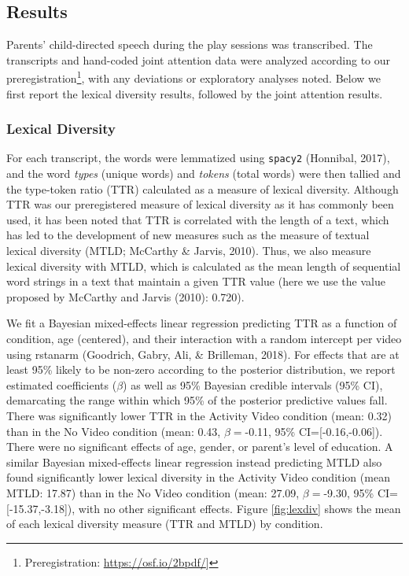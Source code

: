 \documentclass[man,floatsintext]{apa6}
\let\rmarkdownfootnote\footnote%
\def\footnote{\protect\rmarkdownfootnote}
\begin{document}
\hypertarget{results}{%
\subsection{Results}\label{results}}

Parents' child-directed speech during the play sessions was transcribed.
The transcripts and hand-coded joint attention data were analyzed according to our preregistration\footnote{Preregistration: \url{https://osf.io/2bpdf/}{]}}, with any deviations or exploratory analyses noted.
Below we first report the lexical diversity results, followed by the joint attention results.

\hypertarget{lexical-diversity}{%
\subsubsection{Lexical Diversity}\label{lexical-diversity}}

For each transcript, the words were lemmatized using \texttt{spacy2} (Honnibal, 2017), and the word \emph{types} (unique words) and \emph{tokens} (total words) were then tallied and the type-token ratio (TTR) calculated as a measure of lexical diversity.
Although TTR was our preregistered measure of lexical diversity as it has commonly been used, it has been noted that TTR is correlated with the length of a text, which has led to the development of new measures such as the measure of textual lexical diversity (MTLD; McCarthy \& Jarvis, 2010).
Thus, we also measure lexical diversity with MTLD, which is calculated as the mean length of sequential word strings in a text that maintain a given TTR value (here we use the value proposed by McCarthy and Jarvis (2010): 0.720).

We fit a Bayesian mixed-effects linear regression predicting TTR as a function of condition, age (centered), and their interaction with a random intercept per video using rstanarm (Goodrich, Gabry, Ali, \& Brilleman, 2018).
For effects that are at least 95\% likely to be non-zero according to the posterior distribution, we report estimated coefficients (\(\beta\)) as well as 95\% Bayesian credible intervals (95\% CI), demarcating the range within which 95\% of the posterior predictive values fall.
There was significantly lower TTR in the Activity Video condition (mean: 0.32) than in the No Video condition (mean: 0.43, \(\beta=\)-0.11, 95\% CI={[}-0.16,-0.06{]}).
There were no significant effects of age, gender, or parent's level of education.
A similar Bayesian mixed-effects linear regression instead predicting MTLD also found significantly lower lexical diversity in the Activity Video condition (mean MTLD: 17.87) than in the No Video condition (mean: 27.09, \(\beta=\)-9.30, 95\% CI={[}-15.37,-3.18{]}), with no other significant effects.
Figure \ref{fig:lexdiv} shows the mean of each lexical diversity measure (TTR and MTLD) by condition.
\end{document}

